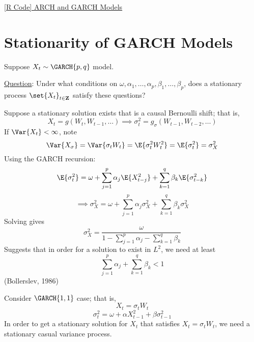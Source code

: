 \href{https://github.com/Hextical/university-notes/blob/master/year-3/semester-2/STAT%20443/code/8.4%20-%20ARCH%20and%20GARCH%20Update.R}{[R Code] ARCH and GARCH Models}
\section{Stationarity of GARCH Models}
Suppose $ X_t \sim \GARCH{p,q} $ model.

\underline{Question}: Under what conditions on $ \omega,\alpha_1,\ldots,\alpha_p,
    \beta_1,\ldots,\beta_p $, does a stationary process $ \set{X_t}_{t\in\mathbf{Z}} $
satisfy these questions?

\begin{Remark}{}{}
    Suppose a stationary solution exists that is a causal Bernoulli shift; that is,
    \[ X_t=g(W_t,W_{t-1},\ldots) \implies \sigma_t^2=g_\sigma(W_{t-1},W_{t-2},\ldots) \]
    If $ \Var{X_t}<\infty $, note
    \[ \Var{X_\sigma}=\Var{\sigma_t W_t}=\E{\sigma_t^2 W_t^2}=\E{\sigma_t^2}=\sigma_X^2 \]
    Using the GARCH recursion:
    \[ \E{\sigma_t^2}=\omega+\sum_{j=1}^{p} \alpha_j \E{X_{t-j}^2}+\sum_{k=1}^{q} \beta_k \E{\sigma^2_{t-k}} \]
    \[ \implies\sigma_X^2=\omega+\sum_{j=1}^{p} \alpha_j \sigma_X^2 +\sum_{k=1}^{q}\beta_k \sigma^2_X  \]
    Solving gives
    \[ \sigma_X^2=\frac{\omega}{1-\sum_{j=1}^{p} \alpha_j-\sum_{k=1}^{q} \beta_k}  \]
    Suggests that in order for a solution to exist in $ L^2 $, we need at least
    \[ \sum_{j=1}^{p} \alpha_j + \sum_{k=1}^{q} \beta_k <1 \]
    (Bollerslev, 1986)
\end{Remark}
Consider $ \GARCH{1,1} $ case; that is,
\[ X_t=\sigma_t W_t \]
\[ \sigma_t^2=\omega+\alpha X_{t-1}^2+\beta \sigma_{t-1}^2 \]
In order to get a stationary solution for $ X_t $ that satisfies
$ X_t=\sigma_t W_t $, we need a stationary casual variance process.

